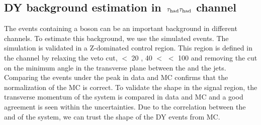 \subsection{\texorpdfstring{DY background estimation in $\,\tau_{\rm had}\tau_{\rm had}$ channel}{DY background estimation in tau-tau channel}}
The events containing a \Z boson can be an important background in different channels. To
estimate this background, we use the simulated events. The simulation
is validated in a Z-dominated control region.
This region is defined in the \muTau channel by relaxing  the \Z veto cut, \mttwo $<$ 20 \GeV, 40 $<$ \tauMT $<$ 100 \GeV and 
removing the cut on the minimum angle in the transverse plane between the \MET and the jets. Comparing the events under the \Z peak in data and MC 
confirms that the normalization of the  MC is correct. To validate the shape in the signal region, 
the transverse momentum of the \Z system is compared in data 
and MC  and a good agreement is seen within the uncertainties. Due to the correlation between the \mttwo and \pt of the \Z system, we can trust the shape of the DY events from MC. 


